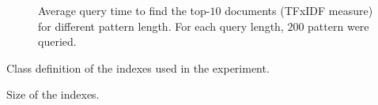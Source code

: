 \documentclass[9pt,a4paper]{scrartcl}
\begin{document}
\pagestyle{empty}

\begin{figure}

\caption{Average query time to find the top-$10$ documents (TFxIDF measure)
for different pattern length. For each query length, $200$ pattern were
queried.}
\end{figure}

\begin{table}
\centering

\caption{Class definition of the indexes used in the experiment.}
\end{table}

\begin{table}
\centering

\caption{Size of the indexes.}
\end{table}
\end{document}
